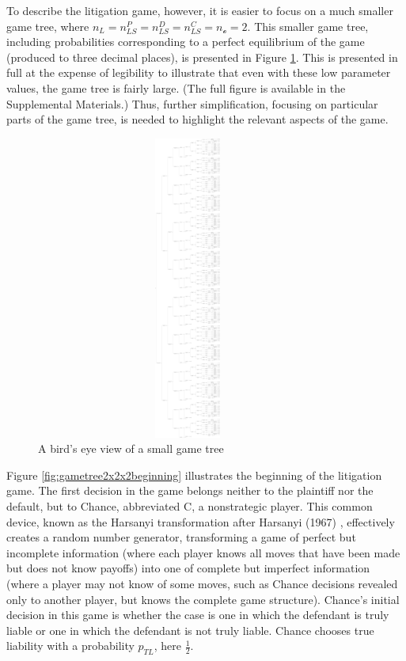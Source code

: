 \documentclass{article}
\begin{document}
To describe the litigation game, however, it is easier to focus on a much smaller game tree, where $n_{L}=n_{LS}^P=n_{LS}^D=n_{LS}^C=n_{\mathcal{o}}=2$. This smaller game tree, including probabilities corresponding to a perfect equilibrium of the game (produced to three decimal places), is presented in Figure \ref{fig:gametree2x2x2}. This is presented in full at the expense of legibility to illustrate that even with these low parameter values, the game tree is fairly large. (The full figure is available in the Supplemental Materials.) Thus, further simplification, focusing on particular parts of the game tree, is needed to highlight the relevant aspects of the game.
\begin{figure}[h!]
\centering
\includegraphics[width=10cm, height=10cm, trim={0in 0in 0in 0in}, clip]{../Figures/game tree 2x2x2.pdf}
\caption{A bird's eye view of a small game tree}
\label{fig:gametree2x2x2}
\end{figure}

Figure \ref{fig:gametree2x2x2beginning} illustrates the beginning of the litigation game. The first decision in the game belongs neither to the plaintiff nor the default, but to Chance, abbreviated C, a nonstrategic player. This common device, known as the Harsanyi transformation after Harsanyi (1967) \cite{harsanyi}, effectively creates a random number generator, transforming a game of perfect but incomplete information (where each player knows all moves that have been made but does not know payoffs) into one of complete but imperfect information (where a player may not know of some moves, such as Chance decisions revealed only to another player, but knows the complete game structure). Chance's initial decision in this game is whether the case is one in which the defendant is truly liable or one in which the defendant is not truly liable. Chance chooses true liability with a probability $p_{TL}$, here $\frac{1}{2}$. 
\end{document}
